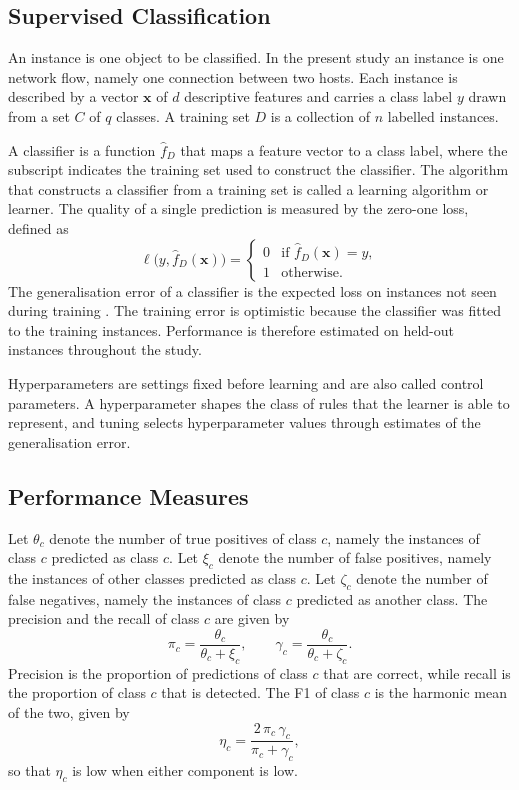 \documentclass[conference]{IEEEtran}
\begin{document}
\subsection{Supervised Classification}

An instance is one object to be classified. In the present study an instance is
one network flow, namely one connection between two hosts. Each instance is
described by a vector $\mathbf{x}$ of $d$ descriptive features and carries a
class label $y$ drawn from a set $C$ of $q$ classes. A training set $D$ is a
collection of $n$ labelled instances.

A classifier is a function $\hat{f}_D$ that maps a feature vector to a class
label, where the subscript indicates the training set used to construct the
classifier. The algorithm that constructs a classifier from a training set is
called a learning algorithm or learner. The quality of a single prediction is
measured by the zero-one loss, defined as
\begin{equation}
\ell\big(y, \hat{f}_D(\mathbf{x})\big) =
\begin{cases} 0 & \text{if } \hat{f}_D(\mathbf{x}) = y,\\ 1 & \text{otherwise.}\end{cases}
\end{equation}
The generalisation error of a classifier is the expected loss on instances not
seen during training \cite{hastie2009}. The training error is optimistic because
the classifier was fitted to the training instances. Performance is therefore
estimated on held-out instances throughout the study.

Hyperparameters are settings fixed before learning and are also called control
parameters. A hyperparameter shapes the class of rules that the learner is able to
represent, and tuning selects hyperparameter values through estimates of the
generalisation error.

\subsection{Performance Measures}

Let $\theta_c$ denote the number of true positives of class $c$, namely the
instances of class $c$ predicted as class $c$. Let $\xi_c$ denote the number of
false positives, namely the instances of other classes predicted as class $c$.
Let $\zeta_c$ denote the number of false negatives, namely the instances of class
$c$ predicted as another class. The precision and the recall of class $c$ are
given by
\begin{equation}
\pi_c = \frac{\theta_c}{\theta_c + \xi_c}, \qquad
\gamma_c = \frac{\theta_c}{\theta_c + \zeta_c} .
\end{equation}
Precision is the proportion of predictions of class $c$ that are correct, while
recall is the proportion of class $c$ that is detected. The F1 of class $c$ is the
harmonic mean of the two, given by
\begin{equation}
\eta_c = \frac{2\,\pi_c\,\gamma_c}{\pi_c + \gamma_c} ,
\end{equation}
so that $\eta_c$ is low when either component is low.
\end{document}
